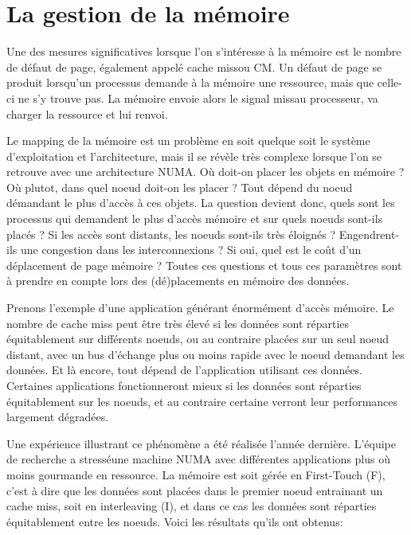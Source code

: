   \section{La gestion de la mémoire}
  
    Une des mesures significatives lorsque l'on s'intéresse à la mémoire est le
    nombre de défaut de page, également appelé \og cache miss\fg ou \og CM\fg. Un
    défaut de page se produit lorsqu'un processus demande à la mémoire une
    ressource, mais que celle-ci ne s'y trouve pas. La mémoire envoie alors le signal
    \og miss\fg au processeur, va charger la ressource et lui renvoi.

    Le mapping de la mémoire est un problème en soit quelque soit le système
    d'exploitation et l'architecture, mais il se révèle très complexe lorsque
    l'on se retrouve avec une architecture NUMA. Où doit-on placer les objets en
    mémoire ? Où plutot, dans quel noeud doit-on les placer ? Tout dépend du
    noeud démandant le plus d'accès à ces objets. La question devient donc,
    quels sont les processus qui demandent le plus d'accès mémoire et sur quels
    noeuds sont-ils placés ? Si les accès sont distants, les noeuds sont-ils
    très éloignés ? Engendrent-ils une congestion dans les interconnexions ? Si
    oui, quel est le coût d'un déplacement de page mémoire ?  Toutes ces
    questions et tous ces paramètres sont à prendre en compte lors des
    (dé)placements en mémoire des données.

    Prenons l'exemple d'une application générant énormément d'accès mémoire. Le
    nombre de cache miss peut être très élevé si les données sont réparties
    équitablement sur différents noeuds, ou au contraire placées sur un seul
    noeud distant, avec un bus d'échange plus ou moins rapide avec le noeud
    demandant les données. Et là encore, tout dépend de l'application utilisant
    ces données. Certaines applications fonctionneront mieux si les données sont
    réparties équitablement sur les noeuds, et au contraire certaine verront
    leur performances largement dégradées.

    Une expérience illustrant ce phénomène a été réalisée l'année
    dernière\cite{Holistic2013}. L'équipe de recherche a \og stressé\fg une
    machine NUMA avec différentes applications plus où moins gourmande en
    ressource. La mémoire est soit gérée en \og First-Touch (F)\fg, c'est à dire
    que les données sont placées dans le premier noeud entrainant un cache miss,
    soit en \og interleaving (I)\fg, et dans ce cas les données sont réparties
    équitablement entre les noeuds. Voici les résultats qu'ils ont obtenus:

